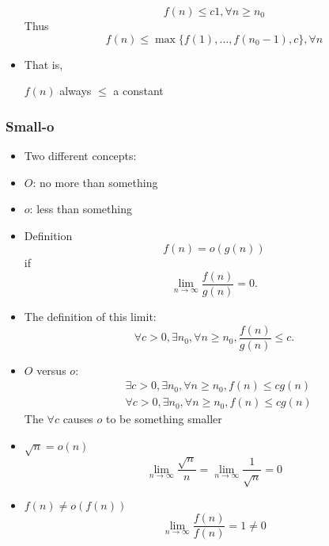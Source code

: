\begin{frame}[allowframebreaks]
\begin{itemize}
  \begin{equation*}
f(n)   \leq c 1, \forall n \geq n_0
\end{equation*}
Thus
\begin{equation*}
  f(n) \leq
  \max \{f(1), \ldots, f(n_0-1), c\}, \forall n
\end{equation*}
\item That is,
  \begin{center}
  $f(n)$ always $\leq$ a constant
\end{center}
\end{itemize}\end{frame} \begin{frame}[allowframebreaks] \frametitle{Small-o}
  \begin{itemize}
  \item Two different concepts:

  \item [] $O$: no more than something

  \item [] $o$: less than something
    
\item Definition 
  \begin{equation*}
  f(n)=o(g(n))
\end{equation*}
  if
  \begin{equation*}
    \lim_{n\rightarrow \infty} \frac{f(n)}{g(n)} = 0.
  \end{equation*}
\item The definition of this limit:
\begin{equation*}
  \forall c > 0, \exists n_0, \forall n \geq n_0,
\frac{f(n)}{g(n)} \leq c.
\end{equation*}
\item $O$ versus $o$:
\begin{equation*}
  \begin{split}
&  \exists c > 0, \exists n_0, \forall n \geq n_0,
f(n) \leq c g(n)\\    
&  \forall c > 0, \exists n_0, \forall n \geq n_0,
f(n) \leq c g(n)
\end{split}
\end{equation*}
The $\forall c$ causes $o$ to be something smaller
\item $\sqrt{n}= o(n)$
  \begin{equation*}
    \lim_{n \rightarrow \infty} \frac{\sqrt{n}}{n}
=
   \lim_{n \rightarrow \infty} \frac{1}{\sqrt{n}}=0
  \end{equation*}
\item $f(n) 
\neq o(f(n))$
\begin{equation*}
    \lim_{n \rightarrow \infty} \frac{f(n)}{f(n)} = 1 \neq 0
\end{equation*}

\end{itemize}\end{frame}


